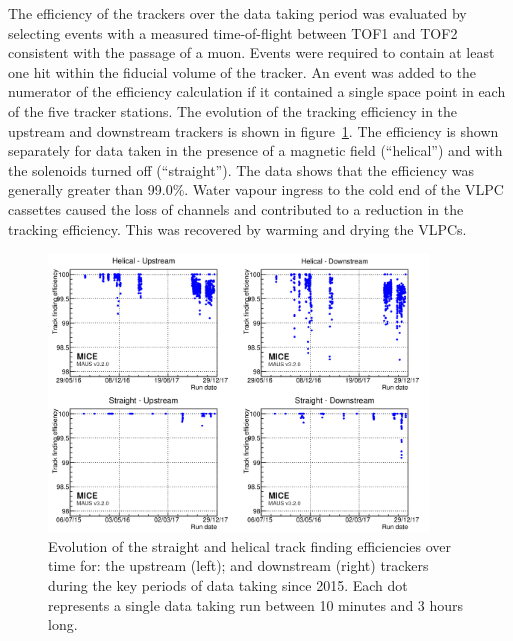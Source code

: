 The efficiency of the trackers over the data taking period was
evaluated by selecting events with a measured time-of-flight between
TOF1 and TOF2 consistent with the passage of a muon.
Events were required to contain at least one hit within the fiducial
volume of the tracker.
An event was added to the numerator of the efficiency calculation if
it contained a single space point in each of the five tracker
stations.
The evolution of the tracking efficiency in the upstream and
downstream trackers is shown in
figure~\ref{fig:trackers:performance:historical}.
The efficiency is shown separately for data taken in the presence of a
magnetic field (``helical'') and with the solenoids turned off
(``straight'').
The data shows that the efficiency was generally greater than 99.0\%.
Water vapour ingress to the cold end of the VLPC cassettes caused the loss of
channels and contributed to a reduction in the tracking efficiency.
This was recovered by warming and drying the VLPCs. \\
\begin{figure}[htb]
  \begin{center}
    \includegraphics[width=0.90\textwidth]{historical_analysis_plot_logo.png}
  \end{center}
  \caption{
    Evolution of the straight and helical track finding efficiencies
    over time for: the upstream (left); and downstream (right) trackers
    during the key periods of data taking since 2015.
    Each dot represents a single data taking run between 10 minutes and 3 hours long.
  }
  \label{fig:trackers:performance:historical} 
\end{figure}

